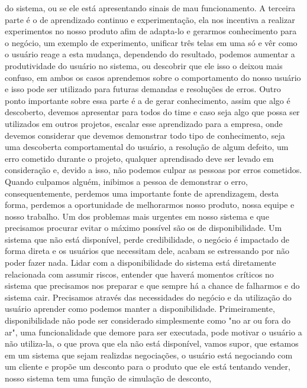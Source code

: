   do sistema, ou se ele está apresentando sinais de mau funcionamento. A terceira
  parte é o de aprendizado continuo e experimentação, ela nos incentiva a realizar
  experimentos no nosso produto afim de adapta-lo e gerarmos conhecimento para o
  negócio, um exemplo de experimento, unificar três telas em uma só e vêr como o
  usuário reage a esta mudança, dependendo do resultado, podemos aumentar a
  produtividade do usuário no sistema, ou descobrir que ele isso o deixou mais
  confuso, em ambos os casos aprendemos sobre o comportamento do nosso usuário e
  isso pode ser utilizado para futuras demandas e resoluções de erros. Outro ponto
  importante sobre essa parte é a de gerar conhecimento, assim que algo é
  descoberto, devemos apresentar para todos do time e caso seja algo que possa
  ser utilizados em outros projetos, escalar esse aprendizado para a empresa,
  onde devemos considerar que devemos demonstrar todo tipo de conhecimento, seja
  uma descoberta comportamental do usuário, a resolução de algum defeito, um erro
  cometido durante o projeto, qualquer aprendisado deve ser levado em consideração
  e, devido a isso, não podemos culpar as pessoas por erros cometidos. Quando
  culpamos alguém, inibimos a pessoa de demonstrar o erro, consequentemente,
  perdemos uma importante fonte de aprendizagem, desta forma, perdemos a oportunidade
  de melhorarmos nosso produto, nossa equipe e nosso trabalho. \newline
  Um dos problemas mais urgentes em nosso sistema e que precisamos procurar evitar
  o máximo possível são os de disponibilidade. Um sistema que não está disponível,
  perde credibilidade, o negócio é impactado de forma direta e os usuários que
  necessitam dele, acabam se estressando por não poder fazer nada. Lidar com a
  disponibilidade do sistema está diretamente relacionada com assumir riscos,
  entender que haverá momentos críticos no sistema que precisamos nos preparar e
  que sempre há a chance de falharmos e do sistema cair. Precisamos através das
  necessidades do negócio e da utilização do usuário aprender como podemos manter
  a disponibilidade. Primeiramente, disponibilidade não pode ser considerado
  simplesmente como "no ar ou fora do ar", uma funcionalidade que demore para ser
  executada, pode motivar o usuário a não utiliza-la, o que prova que ela não está
  disponível, vamos supor, que estamos em um sistema que sejam realizdas negociações,
  o usuário está negociando com um cliente e propõe um desconto para o produto que
  ele está tentando vender, nosso sistema tem uma função de simulação de desconto,
